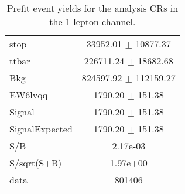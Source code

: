 \begin{table}
\begin{tabular}{|l|c|}
stop & 33952.01 $\pm$ 10877.37\\
ttbar & 226711.24 $\pm$ 18682.68\\
\hline
Bkg & 824597.92 $\pm$ 112159.27\\
\hline
EW6lvqq & 1790.20 $\pm$ 151.38\\
\hline
Signal & 1790.20 $\pm$ 151.38\\
SignalExpected & 1790.20 $\pm$ 151.38\\
\hline
S/B & 2.17e-03\\
S/sqrt(S+B) & 1.97e+00\\
\hline
data & 801406\\ \hline
\end{tabular}
\caption{Prefit event yields for the analysis CRs in the 1 lepton channel.}
\label{tab:1lepPrefitYield_CR}
\end{table}


